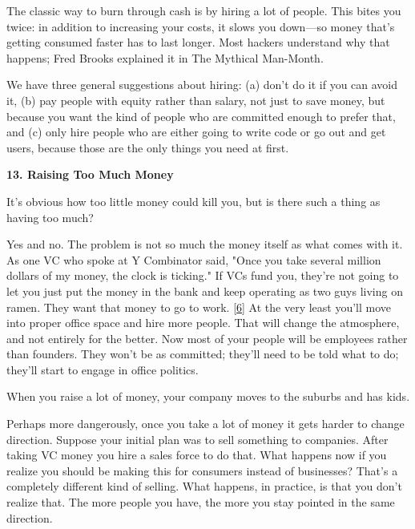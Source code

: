 The
                    classic way to burn through cash is by hiring a lot of
                    people. This bites you twice: in addition to increasing your
                    costs, it slows you down---so money that's getting
                    consumed faster has to last longer. Most hackers understand
                    why that happens; Fred Brooks explained it in The Mythical
                    Man-Month.

We have three general suggestions
                    about hiring: (a) don't do it if you can avoid it, (b) pay
                    people with equity rather than salary, not just to save
                    money, but because you want the kind of people who are
                    committed enough to prefer that, and (c) only hire people
                    who are either going to write code or go out and get users,
                    because those are the only things you need at first.

\textbf{13. Raising Too Much Money}

It's obvious how too little money could kill
                    you, but is there such a thing as having too much?

Yes
                    and no. The problem is not so much the money itself as what
                    comes with it. As one VC who spoke at Y Combinator said,
                    "Once you take several million dollars of my money, the
                    clock is ticking." If VCs fund you, they're not going to let
                    you just put the money in the bank and keep operating as two
                    guys living on ramen. They want that money to go to work.
                    [\href{\#f6n}{6}]
                    At the very least you'll move into proper office space and
                    hire more people. That will change the atmosphere, and not
                    entirely for the better. Now most of your people will be
                    employees rather than founders. They won't be as committed;
                    they'll need to be told what to do; they'll start to engage
                    in office politics.

When you raise a lot of
                    money, your company moves to the suburbs and has kids.

Perhaps
                    more dangerously, once you take a lot of money it gets
                    harder to change direction. Suppose your initial plan was to
                    sell something to companies. After taking VC money you hire
                    a sales force to do that. What happens now if you realize
                    you should be making this for consumers instead of
                    businesses? That's a completely different kind of selling.
                    What happens, in practice, is that you don't realize that.
                    The more people you have, the more you stay pointed in the
                    same direction.

